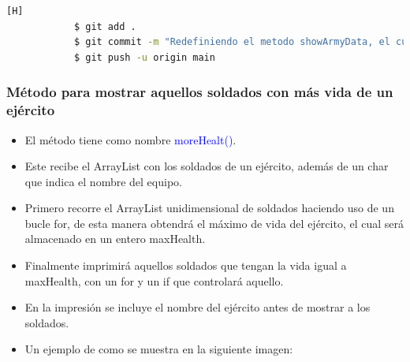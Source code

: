 \documentclass{article}
\begin{document}
        

        \begin{lstlisting}[language=bash,caption={Commit \href{https://github.com/hernanchoquehuanca/fp2-23b/commit/95583b4c0a9e2a11153bc0ea2c34bf933799eaf0}{95583b4}: Se adaptó e implementó el método para mostrar los datos de los soldados de un ejército}][H]
    		$ git add .
    		$ git commit -m "Redefiniendo el metodo showArmyData, el cual nos servira para mostrara los soldados de los ejercitos segun el orden de su creacion"
    		$ git push -u origin main
    	\end{lstlisting}
        
        
        \subsubsection{Método para mostrar aquellos soldados con más vida de un ejército}
        
        \begin{itemize}
            \item El método tiene como nombre \textcolor{blue}{moreHealt()}.
            \item Este recibe el ArrayList con los soldados de un ejército, además de un char que indica el nombre del equipo.
            \item Primero recorre el ArrayList unidimensional de soldados haciendo uso de un bucle for, de esta manera obtendrá el máximo de vida del ejército, el cual será almacenado en un entero maxHealth.
            \item Finalmente imprimirá aquellos soldados que tengan la vida igual a maxHealth, con un for y un if que controlará aquello.
            \item En la impresión se incluye el nombre del ejército antes de mostrar a los soldados.

        \end{itemize}
        \newpage
        

        \begin{itemize}
            \begin{itemize}
                \item Un ejemplo de como se muestra en la siguiente imagen:
            \end{itemize}
        \end{itemize}
\end{document}
